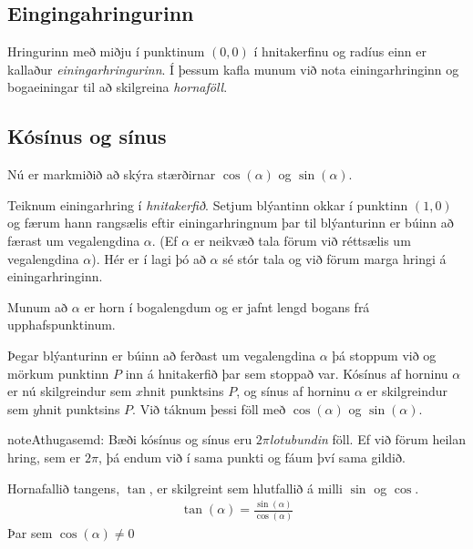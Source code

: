 \documentclass[a4paper,10pt,icelandic]{sphinxmanual}
\begin{document}
\subsection{Eingingahringurinn}
\label{\detokenize{Kafli07:eingingahringurinn}}
Hringurinn með miðju í punktinum \((0,0)\) í hnitakerfinu og radíus einn er kallaður \textit{einingarhringurinn}. Í þessum kafla munum við nota einingarhringinn og bogaeiningar til að skilgreina \textit{hornaföll}.


\subsection{Kósínus og sínus}
\label{\detokenize{Kafli07:id1}}
Nú er markmiðið að skýra stærðirnar \(\cos(\alpha)\) og \(\sin(\alpha)\).

Teiknum einingarhring í \textit{hnitakerfið}.
Setjum blýantinn okkar í punktinn \((1,0)\) og færum hann rangsælis eftir einingarhringnum þar til blýanturinn er búinn að færast um vegalengdina \(\alpha\). (Ef \(\alpha\) er neikvæð tala förum við réttsælis um vegalengdina \(\alpha\)). Hér er í lagi þó að \(\alpha\) sé stór tala og við förum marga hringi á einingarhringinn.


Munum að \(\alpha\) er horn í bogalengdum og er jafnt lengd bogans frá upphafspunktinum.

Þegar blýanturinn er búinn að ferðast um vegalengdina \(\alpha\) þá stoppum við og mörkum punktinn \(P\) inn á hnitakerfið þar sem stoppað var.
Kósínus af horninu \(\alpha\) er nú skilgreindur sem \(x\)\sphinxhyphen{}hnit punktsins \(P\), og sínus af horninu \(\alpha\) er skilgreindur sem \(y\)\sphinxhyphen{}hnit punktsins \(P\). Við táknum þessi föll með \(\cos(\alpha)\) og \(\sin(\alpha)\).


\begin{sphinxadmonition}{note}{Athugasemd:}
Bæði kósínus og sínus eru \(2 \pi\)\sphinxhyphen{}\textit{lotubundin} föll. Ef við förum heilan hring, sem er \(2 \pi\), þá endum við í sama punkti og fáum því sama gildið.
\end{sphinxadmonition}

Hornafallið tangens, \(\tan\), er skilgreint sem hlutfallið á milli \(\sin\) og \(\cos\).
\begin{equation*}
\begin{split}\tan(\alpha) = \frac{\sin(\alpha)}{\cos(\alpha)}\end{split}
\end{equation*}
Þar sem \(\cos(\alpha) \neq 0\)
\end{document}

